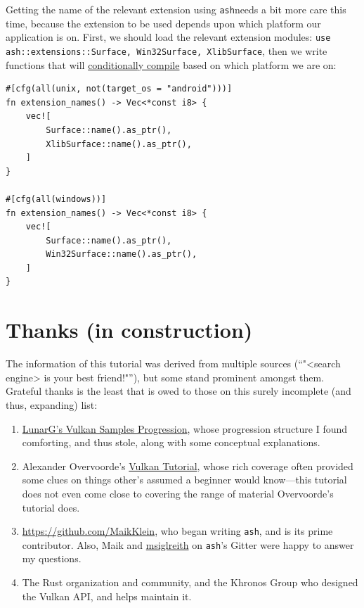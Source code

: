 \documentclass[12pt,letterpaper]{article}
\newcommand{\inquotes}[1]{``#1''}	%
\newcommand{\ril}[1]{\texttt{#1}}
\newcommand{\ash}{\texttt{ash}}
\begin{document}
	Getting the name of the relevant extension using \ash needs a bit more care this time, because the extension to be used depends upon which platform our application is on. First, we should load the relevant extension modules: \ril{use ash::extensions::{Surface, Win32Surface, XlibSurface}}, then we write functions that will \href{https://doc.rust-lang.org/book/first-edition/conditional-compilation.html}{conditionally compile} based on which platform we are on:
\begin{verbatim}
#[cfg(all(unix, not(target_os = "android")))]
fn extension_names() -> Vec<*const i8> {
	vec![
		Surface::name().as_ptr(),
		XlibSurface::name().as_ptr(),
	]
}

#[cfg(all(windows))]
fn extension_names() -> Vec<*const i8> {
	vec![
		Surface::name().as_ptr(),
		Win32Surface::name().as_ptr(),
	]
}
\end{verbatim}
	
	
	
	
	


\section{Thanks (in construction)}
	The information of this tutorial was derived from multiple sources (\inquotes{"<search engine> is your best friend!"}), but some stand prominent amongst them. Grateful thanks is the least that is owed to those on this surely incomplete (and thus, expanding) list:
		\begin{enumerate}
			\item \href{https://vulkan.lunarg.com/doc/sdk/1.0.65.1/windows/tutorial/html/index.html}{LunarG's Vulkan Samples Progression}, whose progression structure I found comforting, and thus stole, along with some conceptual explanations. 
			
			\item Alexander Overvoorde's \href{https://vulkan-tutorial.com/}{Vulkan Tutorial}, whose rich coverage often provided some clues on things other's assumed a beginner would know---this tutorial does not even come close to covering the range of material Overvoorde's tutorial does.
			
			\item \href{Maik Klein}{https://github.com/MaikKlein}, who began writing \ash, and is its prime contributor. Also, Maik and \href{https://github.com/msiglreith}{msiglreith} on \ash's Gitter were happy to answer my questions.
			
			\item The Rust organization and community, and the Khronos Group who designed the Vulkan API, and helps maintain it.
		\end{enumerate}
\printbibliography
\end{document}
